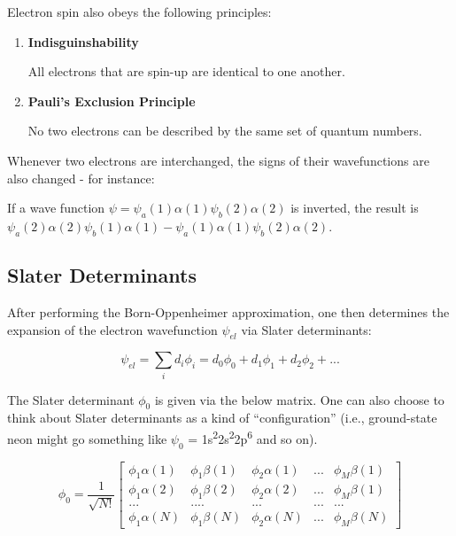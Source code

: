 \documentclass[
  letterpaper,
  DIV=11,
  numbers=noendperiod]{scrreprt}
\begin{document}
Electron spin also obeys the following principles:

\begin{enumerate}
\def\labelenumi{\arabic{enumi}.}
\item
  \textbf{Indisguinshability}

  All electrons that are spin-up are identical to one another.
\item
  \textbf{Pauli's Exclusion Principle}

  No two electrons can be described by the same set of quantum numbers.
\end{enumerate}

Whenever two electrons are interchanged, the signs of their
wavefunctions are also changed - for instance:

If a wave function \(\psi = \psi_a(1)\alpha(1)\psi_b(2)\alpha(2)\) is
inverted, the result is
\(\psi_a(2)\alpha(2)\psi_b(1)\alpha(1) - \psi_a(1)\alpha(1)\psi_b(2)\alpha(2)\).

\hypertarget{slater-determinants}{%
\subsection{Slater Determinants}\label{slater-determinants}}

After performing the Born-Oppenheimer approximation, one then determines
the expansion of the electron wavefunction \(\psi_{el}\) via Slater
determinants:

\begin{equation}
  \psi_{el} = \sum_id_i\phi_i = d_0\phi_0 + d_1\phi_1 + d_2\phi_2 + ...
\end{equation}

The Slater determinant \(\phi_0\) is given via the below matrix. One can
also choose to think about Slater determinants as a kind of
``configuration'' (i.e., ground-state neon might go something like
\(\psi_0\) =
1s\textsuperscript{2}2s\textsuperscript{2}2p\textsuperscript{6} and so
on).

\begin{equation}
  \phi_0 = \frac{1}{\sqrt{N!}}\left[
  \begin{matrix}
    \phi_1\alpha(1) & \phi_1\beta(1) & \phi_2\alpha(1) & ... & \phi_M\beta(1) \\
    \phi_1\alpha(2) & \phi_1\beta(2) & \phi_2\alpha(2) & ... & \phi_M\beta(1) \\ 
    ... & .... & ... & ... & ... \\ 
    \phi_1\alpha(N) & \phi_1\beta(N) & \phi_2\alpha(N) & ... & \phi_M\beta(N)    
  \end{matrix}
  \right]
\end{equation}
\end{document}
